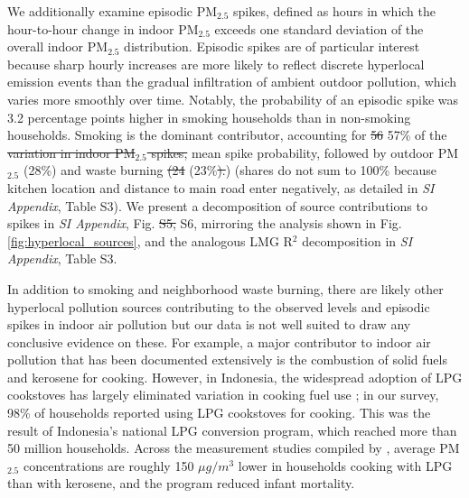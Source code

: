 \documentclass[9pt,twocolumn,twoside]{pnas-new}
\providecommand{\DIFadd}[1]{{\protect\color{red}#1}}
\providecommand{\DIFdel}[1]{{\protect\color{red}\protect\sout{#1}}}
\begin{document}
We additionally examine episodic PM$_{2.5}$ spikes, defined as hours in which the hour-to-hour change in indoor PM$_{2.5}$ exceeds one standard deviation of the overall indoor PM$_{2.5}$ distribution. Episodic spikes are of particular interest because sharp hourly increases are more likely to reflect discrete hyperlocal emission events than the gradual infiltration of ambient outdoor pollution, which varies more smoothly over time. Notably, the probability of an episodic spike was 3.2 percentage points higher in smoking households than in non-smoking households. Smoking is the dominant contributor, accounting for \DIFdel{56} \DIFadd{57}\% of the \DIFdel{variation in indoor PM$_{2.5}$ spikes,} \DIFadd{mean spike probability,} followed by outdoor PM$_{2.5}$ (28\%) and waste burning \DIFdel{(24} \DIFadd{(23}\%\DIFdel{).}\DIFadd{) (shares do not sum to 100\% because kitchen location and distance to main road enter negatively, as detailed in} \textit{\DIFadd{SI Appendix}}\DIFadd{, Table S3).} We present a decomposition of source contributions to spikes in \textit{SI Appendix}, Fig. \DIFdel{S5,} \DIFadd{S6,} mirroring the analysis shown in Fig. \ref{fig:hyperlocal_sources}, and the analogous LMG R$^2$ decomposition in \textit{SI Appendix}, Table S3.

In addition to smoking and neighborhood waste burning, there are likely other hyperlocal pollution sources contributing to the observed levels and episodic spikes in indoor air pollution but our data is not well suited to draw any conclusive evidence on these. For example, a major contributor to indoor air pollution that has been documented extensively is the combustion of solid fuels and kerosene for cooking. However, in Indonesia, the widespread adoption of LPG cookstoves has largely eliminated variation in cooking fuel use \citep{astuti_successful_2019}; in our survey, 98\% of households reported using LPG cookstoves for cooking. 
\DIFadd{This was the result of Indonesia's national LPG conversion program, which reached more than 50 million households. Across the measurement studies compiled by \citet{Imelda2020}, average PM$_{2.5}$ concentrations are roughly 150 $\mu g/m^3$ lower in households cooking with LPG than with kerosene, and the program reduced infant mortality.}
\end{document}
